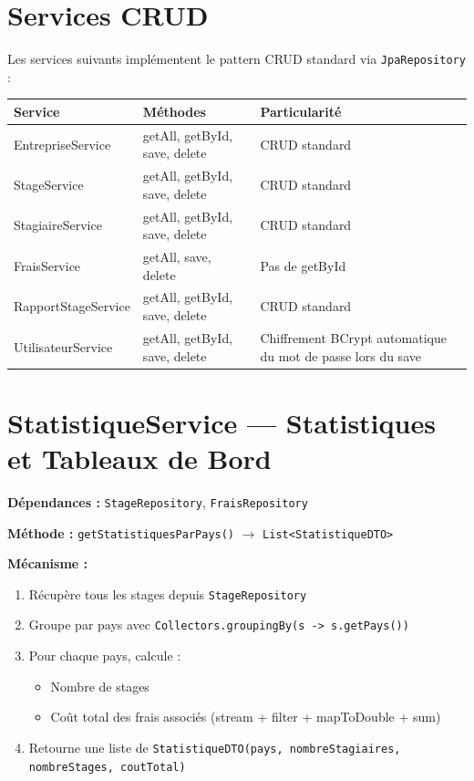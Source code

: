 \documentclass[12pt,a4paper]{report}
\begin{document}
\section{Services CRUD}

Les services suivants implémentent le pattern CRUD standard via \texttt{JpaRepository} :

\begin{longtable}{|l|l|p{6.5cm}|}
\hline
\textbf{Service} & \textbf{Méthodes} & \textbf{Particularité} \\ \hline \endhead
EntrepriseService & getAll, getById, save, delete & CRUD standard \\ \hline
StageService & getAll, getById, save, delete & CRUD standard \\ \hline
StagiaireService & getAll, getById, save, delete & CRUD standard \\ \hline
FraisService & getAll, save, delete & Pas de getById \\ \hline
RapportStageService & getAll, getById, save, delete & CRUD standard \\ \hline
UtilisateurService & getAll, getById, save, delete & Chiffrement BCrypt automatique du mot de passe lors du save \\ \hline
\end{longtable}

\section{StatistiqueService --- Statistiques et Tableaux de Bord}

\textbf{Dépendances :} \texttt{StageRepository}, \texttt{FraisRepository}

\textbf{Méthode :} \texttt{getStatistiquesParPays()} $\rightarrow$ \texttt{List<StatistiqueDTO>}

\textbf{Mécanisme :}
\begin{enumerate}
    \item Récupère tous les stages depuis \texttt{StageRepository}
    \item Groupe par pays avec \texttt{Collectors.groupingBy(s -> s.getPays())}
    \item Pour chaque pays, calcule :
    \begin{itemize}
        \item Nombre de stages
        \item Coût total des frais associés (stream + filter + mapToDouble + sum)
    \end{itemize}
    \item Retourne une liste de \texttt{StatistiqueDTO(pays, nombreStagiaires, nombreStages, coutTotal)}
\end{enumerate}
\end{document}
